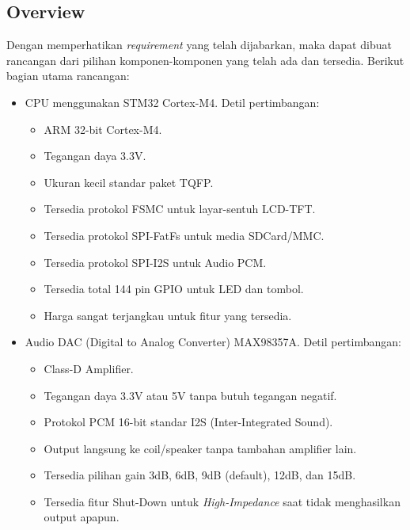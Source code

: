 \documentclass[12pt,]{article}
\begin{document}
	\subsection{Overview}
	Dengan memperhatikan \textit{requirement} yang telah dijabarkan, maka dapat dibuat rancangan dari pilihan
	komponen-komponen yang telah ada dan tersedia.
	Berikut bagian utama rancangan:
	\begin{itemize}
		\item CPU menggunakan STM32 Cortex-M4.
		Detil pertimbangan:
		\begin{itemize}
			\item ARM 32-bit Cortex-M4. 
			\item Tegangan daya 3.3V.
			\item Ukuran kecil standar paket TQFP.
			\item Tersedia protokol FSMC untuk layar-sentuh LCD-TFT.
			\item Tersedia protokol SPI-FatFs untuk media SDCard/MMC.
			\item Tersedia protokol SPI-I2S untuk Audio PCM.
			\item Tersedia total 144 pin GPIO untuk LED dan tombol.
			\item Harga sangat terjangkau untuk fitur yang tersedia.
		\end{itemize}
		
		\item Audio DAC (Digital to Analog Converter) MAX98357A.
		Detil pertimbangan:
		\begin{itemize}
			\item Class-D Amplifier.
			\item Tegangan daya 3.3V atau 5V tanpa butuh tegangan negatif.
			\item Protokol PCM 16-bit standar I2S (Inter-Integrated Sound).
			\item Output langsung ke coil/speaker tanpa tambahan amplifier lain. 
			\item Tersedia pilihan gain 3dB, 6dB, 9dB (default), 12dB, dan 15dB.
			\item Tersedia fitur Shut-Down untuk \textit{High-Impedance}
			saat tidak menghasilkan output apapun.
		\end{itemize}
	\end{itemize}
\end{document}
